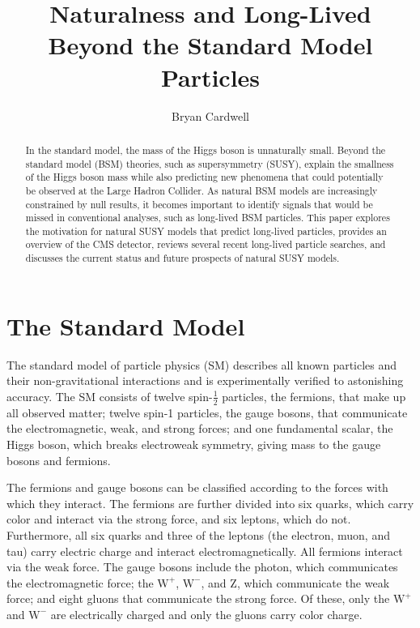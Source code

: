 \documentclass[12pt]{article}
\title{Naturalness and Long-Lived Beyond the Standard Model Particles}
\author{Bryan Cardwell}
\begin{document}
\singlespacing
\maketitle

\begin{abstract}
    In the standard model, the mass of the Higgs boson is unnaturally small. Beyond the standard model (BSM) theories, such as supersymmetry (SUSY), explain the smallness of the Higgs boson mass while also predicting new phenomena that could potentially be observed at the Large Hadron Collider. As natural BSM models are increasingly constrained by null results, it becomes important to identify signals that would be missed in conventional analyses, such as long-lived BSM particles. This paper explores the motivation for natural SUSY models that predict long-lived particles, provides an overview of the CMS detector, reviews several recent long-lived particle searches, and discusses the current status and future prospects of natural SUSY models.

\end{abstract}

\newpage
\tableofcontents
\newpage
\doublespacing
{}

\section{The Standard Model} \label{SM}
    The standard model of particle physics (SM) describes all known particles and their non-gravitational interactions and is experimentally verified to astonishing accuracy. The SM consists of twelve spin-$\frac{1}{2}$ particles, the fermions, that make up all observed matter; twelve spin-1 particles, the gauge bosons, that communicate the electromagnetic, weak, and strong forces; and one fundamental scalar, the Higgs boson, which breaks electroweak symmetry, giving mass to the gauge bosons and fermions.

    The fermions and gauge bosons can be classified according to the forces with which they interact. The fermions are further divided into six quarks, which carry color and interact via the strong force, and six leptons, which do not. Furthermore, all six quarks and three of the leptons (the electron, muon, and tau) carry electric charge and interact electromagnetically. All fermions interact via the weak force. The gauge bosons include the photon, which communicates the electromagnetic force; the $\mathrm{W}^+$, $\mathrm{W}^-$, and $\mathrm{Z}$, which communicate the weak force; and eight gluons that communicate the strong force. Of these, only the $\mathrm{W}^+$ and $\mathrm{W}^-$ are electrically charged and only the gluons carry color charge.
\end{document}
